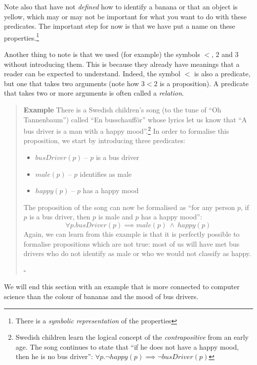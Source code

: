 \documentclass{tufte-handout}
\newcounter{example}
\newenvironment{example}
{\refstepcounter{example}\begin{quote}
\textbf{Example \arabic{example}}}
{

$\square$\end{quote}}
\begin{document}
\noindent
Note also that have not \emph{defined} how to identify a banana or
that an object is yellow, which may or may not be important for
what you want to do with these predicates. The important step for
now is that we have put a name on these properties.\footnote{There
  is a \emph{symbolic representation} of the properties}

Another thing to note is that we used (for example) the symbols
$<$, $2$ and $3$ without introducing them. This is because they
already have meanings that a reader can be expected to understand.
Indeed, the symbol $<$ is also a predicate, but one that takes two
arguments (note how $3 < 2$ is a proposition). A predicate that
takes two or more arguments is often called a \emph{relation}.

\begin{example}\label{ex:busdriver}
  There is a Swedish children's song (to the tune of ``Oh
  Tannenbaum'') called ``En busschauff\"{o}r'' whose lyrics let us
  know that ``A bus driver is a man with a happy
  mood''.\footnote{Swedish children learn the logical concept of
    the \emph{contrapositive} from an early age. The song
    continues to state that ``if he does not have a happy mood,
    then he is no bus driver'':
    $\forall p. \lnot \mathit{happy}(p) \implies \lnot
    \mathit{busDriver}(p)$} In order to formalise this
  proposition, we start by introducing three predicates:
  \begin{itemize}
  \item $\mathit{busDriver}(p)$ -- $p$ is a bus driver
  \item $\mathit{male}(p)$ -- $p$ identifies as male
  \item $\mathit{happy}(p)$ -- $p$ has a happy mood
  \end{itemize}
  The proposition of the song can now be formalised as ``for any
  person $p$, if $p$ is a bus driver, then $p$ is male and $p$ has
  a happy mood'':
  \[
    \forall p.
    \mathit{busDriver}(p) \implies
    \mathit{male}(p) ~\land~
    \mathit{happy}(p)
  \]
  Again, we can learn from this example is that it is perfectly
  possible to formalise propositions which are not true: most of
  us will have met bus drivers who do not identify as male or who
  we would not classify as happy.
\end{example}

\noindent
We will end this section with an example that is more connected to
computer science than the colour of bananas and the mood of bus
drivers.
\end{document}
